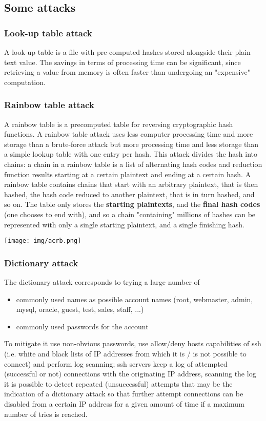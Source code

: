 \documentclass[a4paper, 10pt, titlepage]{article}
\begin{document}
\subsection{Some attacks}
\subsubsection*{Look-up table attack}
A look-up table is a file with pre-computed hashes stored alongside their plain text value. The savings in terms of processing time can be significant, since retrieving a value from memory is often faster than undergoing an "expensive" computation.

\subsubsection*{Rainbow table attack}
A rainbow table is a precomputed table for reversing cryptographic hash functions. A rainbow table attack uses less computer processing time and more storage than a brute-force attack but more processing time and less storage than a simple lookup table with one entry per hash. This attack divides the hash into chains: a chain in a rainbow table is a list of alternating hash codes and reduction function results starting at a certain plaintext and ending at a certain hash.
A rainbow table contains chains that start with an arbitrary plaintext, that is then hashed, the hash code reduced to another plaintext, that is in turn hashed, and so on. The table only stores the \textbf{starting plaintexts}, and the \textbf{final hash codes} (one chooses to end with), and so a chain "containing" millions of hashes can be represented with only a single starting plaintext, and a single finishing hash.
\begin{center}
\texttt{[image: img/acrb.png]}
\end{center}

\subsubsection*{Dictionary attack}
The dictionary attack corresponds to trying a large number of
\begin{itemize}
\item commonly used names as possible account names (root, webmaster, admin, mysql, oracle, guest, test, sales, staff, ...)
\item commonly used passwords for the account
\end{itemize}
To mitigate it use non-obvious passwords, use allow/deny hosts capabilities of ssh (i.e. white and black lists of IP addresses from which it is / is not possible to connect) and perform log scanning; ssh servers keep a log of attempted (successful or not) connections with the originating IP address, scanning the log it is possible to detect repeated (unsuccessful) attempts that may be the indication of a dictionary attack so that further attempt connections can be disabled from a certain IP address for a given amount of time if a maximum number of tries is reached.
\end{document}
